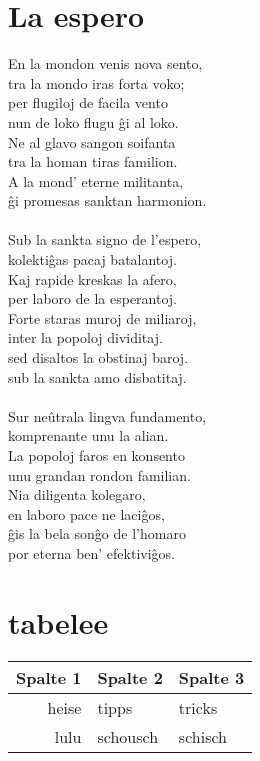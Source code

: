 \documentclass[12pt]{scrartcl}
\begin{document}
\section{La espero}
	En la mondon venis nova sento,\\
	tra la mondo iras forta voko;\\
	per flugiloj de facila vento\\
	nun de loko flugu \^gi al loko.\\
	Ne al glavo sangon soifanta\\
	tra la homan tiras familion.\\
	A la mond' eterne militanta,\\
	\^gi promesas sanktan harmonion. \\\\
	Sub la sankta signo de l'espero,\\
	kolekti\^gas pacaj batalantoj.\\
	Kaj rapide kreskas la afero,\\
	per laboro de la esperantoj.\\
	Forte staras muroj de miliaroj,\\
	inter la popoloj dividitaj.\\
	sed disaltos la obstinaj baroj.\\
	sub la sankta amo disbatitaj. \\\\
	Sur neûtrala lingva fundamento,\\
	komprenante unu la alian.\\
	La popoloj faros en konsento\\
	unu grandan rondon familian.\\
    Nia diligenta kolegaro,\\
    en laboro pace ne laci\^gos,\\
    \^gis la bela son\^go de l'homaro\\
    por eterna ben' efektivi\^gos.\\
    
    
\section{tabelee}
\begin{tabular}[h]{r|ll}
	Spalte 1 & Spalte 2 & Spalte 3 \\
	\hline
	heise & tipps & tricks \\
	\hline
	\hline
	lulu & schousch & schisch \\
	\hline
	\hline
	\hline
\end{tabular}
    	
\end{document}
